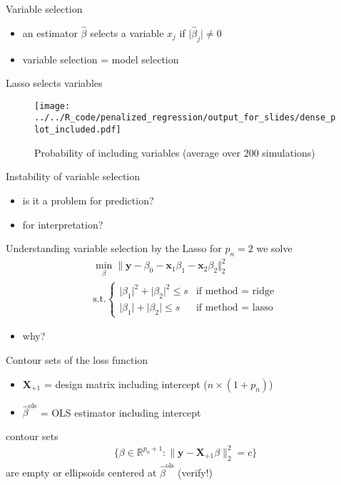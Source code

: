 \documentclass[xcolor=dvipsnames, handout]{beamer}
\begin{document}
\begin{frame}{Variable selection}
\begin{itemize}
  \item an estimator $\hat{\beta}$ selects a variable $x_j$ if $\lvert \hat{\beta}_j \rvert \neq 0$
  \item variable selection = model selection
\end{itemize}
\end{frame}


\begin{frame}{Lasso selects variables}
\begin{figure}
  \texttt{[image: ../../R\_code/penalized\_regression/output\_for\_slides/dense\_plot\_included.pdf]}
   \caption{Probability of including variables (average over 200 simulations)}
\end{figure}
\end{frame}


\begin{frame}{Instability of variable selection}
\begin{itemize}
  \item is it a problem for prediction?
  \item for interpretation?
\end{itemize}
\end{frame}


\begin{frame}{Understanding variable selection by the Lasso}
for $p_n = 2$ we solve 
\begin{align*}
  \min_{\beta} \lVert \mathbf{y} - \beta_0 - \mathbf{x}_1\beta_1 - \mathbf{x}_2\beta_2 \Vert_2^2
  \\
  \text{s.t.} \begin{cases}
    \lvert\beta_1\rvert^2 + \lvert \beta_2\rvert^2 \leq s & \text{if method = ridge}
  \\
    \lvert \beta_1\vert + \lvert \beta_2 \rvert \leq s & \text{if method = lasso}
  \end{cases}
\end{align*}
\begin{itemize}
  \item why?
\end{itemize}
\end{frame}


\begin{frame}{Contour sets of the loss function}    
\begin{itemize}
  \item 
  $\mathbf{X}_{+1}$ = design matrix including intercept ($n \times (1 + p_n)$)
  \item 
  $\hat{\beta}^{\text{ols}}$ = OLS estimator including intercept
\end{itemize}
contour sets 
\begin{align*}
\big\{
  \beta \in \mathbb{R}^{p_n + 1} : \lVert \mathbf{y} - \mathbf{X}_{+1} \beta \rVert_2^2 = c 
\big\}
\end{align*}
are empty or ellipsoids centered at $\hat{\beta}^{\text{ols}}$ (verify!)
\end{frame}
\end{document}
